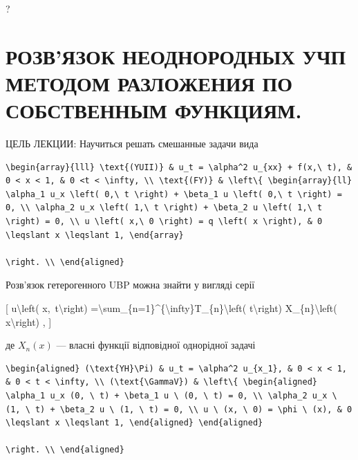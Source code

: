 \documentclass[
]{article}
\begin{document}
?

\section{РОЗВ'ЯЗОК НЕОДНОРОДНЫХ УЧП МЕТОДОМ РАЗЛОЖЕНИЯ ПО СОБСТВЕННЫМ
ФУНКЦИЯМ.}\label{ux440ux43eux437ux432ux44fux437ux43eux43a-ux43dux435ux43eux434ux43dux43eux440ux43eux434ux43dux44bux445-ux443ux447ux43f-ux43cux435ux442ux43eux434ux43eux43c-ux440ux430ux437ux43bux43eux436ux435ux43dux438ux44f-ux43fux43e-ux441ux43eux431ux441ux442ux432ux435ux43dux43dux44bux43c-ux444ux443ux43dux43aux446ux438ux44fux43c.}

ЦЕЛЬ ЛЕКЦИИ: Научиться решать смешанные задачи вида

\begin{verbatim}
\begin{array}{lll} \text{(YUII)} & u_t = \alpha^2 u_{xx} + f(x,\ t), & 0 < x < 1, & 0 <t < \infty, \\ \text{(FY)} & \left\{ \begin{array}{ll} \alpha_1 u_x \left( 0,\ t \right) + \beta_1 u \left( 0,\ t \right) = 0, \\ \alpha_2 u_x \left( 1,\ t \right) + \beta_2 u \left( 1,\ t \right) = 0, \\ u \left( x,\ 0 \right) = q \left( x \right), & 0 \leqslant x \leqslant 1, \end{array}

\right. \\ \end{aligned}
\end{verbatim}

Розв'язок гетерогенного UBP можна знайти у вигляді серії

{[} u\textbackslash left( x,~t\textbackslash right)
=\textbackslash sum\_\{n=1\}\^{}\{\textbackslash infty\}T\_\{n\}\textbackslash left(
t\textbackslash right) X\_\{n\}\textbackslash left(
x\textbackslash right) , {]}

де \(X_n\left(x\right)\) --- власні функції відповідної однорідної
задачі

\begin{verbatim}
\begin{aligned} (\text{YH}\Pi) & u_t = \alpha^2 u_{x_1}, & 0 < x < 1, & 0 < t < \infty, \\ (\text{\GammaV}) & \left\{ \begin{aligned} \alpha_1 u_x (0, \ t) + \beta_1 u \ (0, \ t) = 0, \\ \alpha_2 u_x \ (1, \ t) + \beta_2 u \ (1, \ t) = 0, \\ u \ (x, \ 0) = \phi \ (x), & 0 \leqslant x \leqslant 1, \end{aligned} \end{aligned}

\right. \\ \end{aligned}
\end{verbatim}
\end{document}
